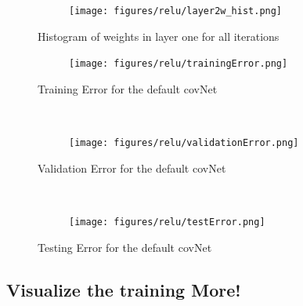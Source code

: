 \documentclass[]{article}
\begin{document}
\begin{figure}
    \centering
    \begin{subfigure}
        \centering
        \texttt{[image: figures/relu/layer2w\_hist.png]}
    \end{subfigure}%
    \caption{Histogram of weights in layer one for all iterations}
 \label{fig:/layer2w_hist}
\end{figure}


\begin{figure}[ht]
    \centering
    \begin{subfigure}
        \centering
        \texttt{[image: figures/relu/trainingError.png]}
    \end{subfigure}%
    \caption{Training Error for the default covNet}
 \label{fig:TrainingError1}
    ~ 
    \centering
    \begin{subfigure}
        \centering
        \texttt{[image: figures/relu/validationError.png]}
    \end{subfigure}%
    \caption{Validation Error for the default covNet}
 \label{fig:ValidationError1}
    ~ 
    \centering
    \begin{subfigure}
        \centering
        \texttt{[image: figures/relu/testError.png]}
    \end{subfigure}%
    \caption{Testing Error for the default covNet}
 \label{fig:testingError1}
\end{figure}

\clearpage
\subsection{Visualize the training More!}
\end{document}
